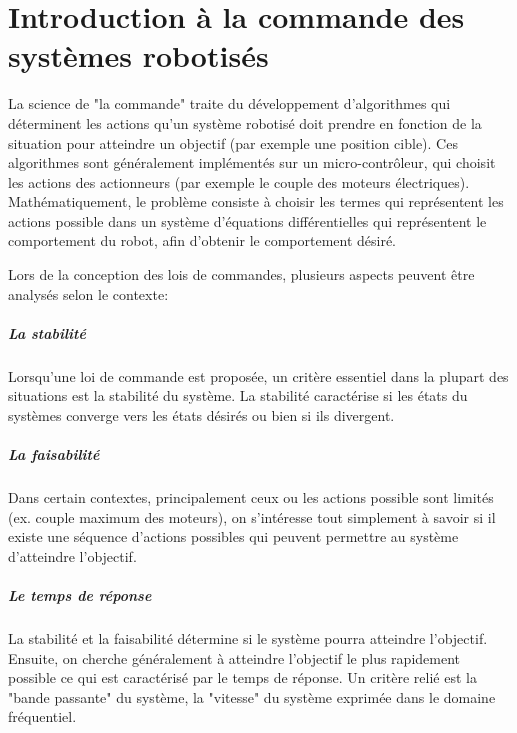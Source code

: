 \chapter{Introduction à la commande des systèmes robotisés}


La science de "la commande" traite du développement d'algorithmes qui déterminent les actions qu'un système robotisé doit prendre en fonction de la situation pour atteindre un objectif (par exemple une position cible). Ces algorithmes sont généralement implémentés sur un micro-contrôleur, qui choisit les actions des actionneurs (par exemple le couple des moteurs électriques). Mathématiquement, le problème consiste à choisir les termes qui représentent les actions possible dans un système d'équations différentielles qui représentent le comportement du robot, afin d'obtenir le comportement désiré.

Lors de la conception des lois de commandes, plusieurs aspects peuvent être analysés selon le contexte: 

\paragraph{La stabilité} 

Lorsqu'une loi de commande est proposée, un critère essentiel dans la plupart des situations est la stabilité du système. La stabilité caractérise si les états du systèmes converge vers les états désirés ou bien si ils divergent. 

\paragraph{La faisabilité} 

Dans certain contextes, principalement ceux ou les actions possible sont limités (ex. couple maximum des moteurs), on s'intéresse tout simplement à savoir si il existe une séquence d'actions possibles qui peuvent permettre au système d'atteindre l'objectif. 

\paragraph{Le temps de réponse} 

La stabilité et la faisabilité détermine si le système pourra atteindre l'objectif. Ensuite, on cherche généralement à atteindre l'objectif le plus rapidement possible ce qui est caractérisé par le temps de réponse. Un critère relié est la "bande passante" du système, la "vitesse" du système exprimée dans le domaine fréquentiel.

